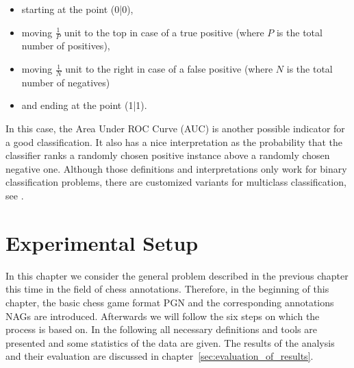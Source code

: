 \documentclass[article,type=msc,colorback,accentcolor=tud7b]{tudthesis}
\begin{document}
    \begin{itemize}[noitemsep]
      \item starting at the point (0|0),
      \item moving $\frac{1}{P}$ unit to the top in case of a true positive (where $P$ is the total number of positives),
      \item moving $\frac{1}{N}$ unit to the right in case of a false positive (where $N$ is the total number of negatives)
      \item and ending at the point (1|1).
    \end{itemize}
    In this case, the Area Under ROC Curve (AUC) is another possible indicator for a good classification. It also has a nice interpretation as the probability that the classifier ranks a randomly chosen positive instance above a randomly chosen negative one. Although those definitions and interpretations only work for binary classification problems, there are customized variants for multiclass classification, see \autocite{Hand2001}.

  \clearpage
  
  \section{Experimental Setup}
  \label{sec:experimental_setup}
    In this chapter we consider the general problem described in the previous chapter this time in the field of chess annotations. Therefore, in the beginning of this chapter, the basic chess game format PGN and the corresponding annotations NAGs are introduced. Afterwards we will follow the six steps on which the process is based on. In the following all necessary definitions and tools are presented and some statistics of the data are given. The results of the analysis and their evaluation are discussed in chapter~\ref{sec:evaluation_of_results}.
    
\end{document}
